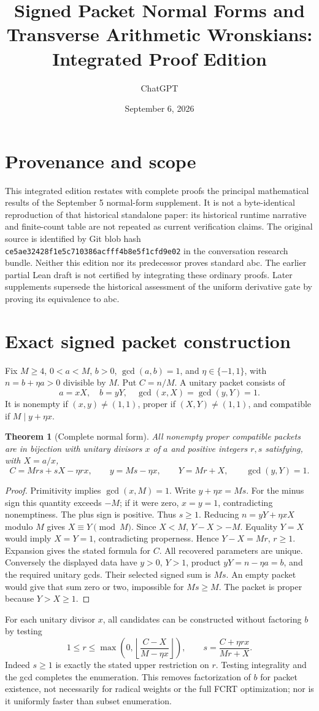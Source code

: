 \documentclass[11pt]{amsart}
\title{Signed Packet Normal Forms and Transverse Arithmetic Wronskians: Integrated Proof Edition}
\author{ChatGPT}
\date{September 6, 2026}
\newtheorem{theorem}{Theorem}[section]
\theoremstyle{definition}\newtheorem{definition}[theorem]{Definition}
\theoremstyle{remark}\newtheorem{remark}[theorem]{Remark}
\begin{document}
\maketitle
\section{Provenance and scope}
This integrated edition restates with complete proofs the principal mathematical results of the September 5 normal-form supplement. It is not a byte-identical reproduction of that historical standalone paper: its historical runtime narrative and finite-count table are not repeated as current verification claims. The original source is identified by Git blob hash \texttt{ce5ae32428f1e5c710386acfff4b8e5f1cfd9e02} in the conversation research bundle. Neither this edition nor its predecessor proves standard abc. The earlier partial Lean draft is not certified by integrating these ordinary proofs. Later supplements supersede the historical assessment of the uniform derivative gate by proving its equivalence to abc.

\section{Exact signed packet construction}
Fix $M\ge4$, $0<a<M$, $b>0$, $\gcd(a,b)=1$, and $\eta\in\{-1,1\}$, with $n=b+\eta a>0$ divisible by $M$. Put $C=n/M$. A unitary packet consists of
\[
 a=xX,\quad b=yY,\quad \gcd(x,X)=\gcd(y,Y)=1.
\]
It is nonempty if $(x,y)\ne(1,1)$, proper if $(X,Y)\ne(1,1)$, and compatible if $M\mid y+\eta x$.
\begin{theorem}[Complete normal form]\label{thm:normal}
All nonempty proper compatible packets are in bijection with unitary divisors $x$ of $a$ and positive integers $r,s$ satisfying, with $X=a/x$,
\[
 C=Mrs+sX-\eta rx,\qquad y=Ms-\eta x,\qquad Y=Mr+X,\qquad\gcd(y,Y)=1.
\]
\end{theorem}
\begin{proof}
Primitivity implies $\gcd(x,M)=1$. Write $y+\eta x=Ms$. For the minus sign this quantity exceeds $-M$; if it were zero, $x=y=1$, contradicting nonemptiness. The plus sign is positive. Thus $s\ge1$. Reducing $n=yY+\eta xX$ modulo $M$ gives $X\equiv Y\pmod M$. Since $X<M$, $Y-X>-M$. Equality $Y=X$ would imply $X=Y=1$, contradicting properness. Hence $Y-X=Mr$, $r\ge1$. Expansion gives the stated formula for $C$. All recovered parameters are unique.
Conversely the displayed data have $y>0$, $Y>1$, product $yY=n-\eta a=b$, and the required unitary gcds. Their selected signed sum is $Ms$. An empty packet would give that sum zero or two, impossible for $Ms\ge M$. The packet is proper because $Y>X\ge1$.
\end{proof}
For each unitary divisor $x$, all candidates can be constructed without factoring $b$ by testing
\[
 1\le r\le\max\left(0,\left\lfloor\frac{C-X}{M-\eta x}\right\rfloor\right),
 \qquad s=\frac{C+\eta rx}{Mr+X}.
\]
Indeed $s\ge1$ is exactly the stated upper restriction on $r$. Testing integrality and the gcd completes the enumeration. This removes factorization of $b$ for packet existence, not necessarily for radical weights or the full FCRT optimization; nor is it uniformly faster than subset enumeration.
\end{document}
